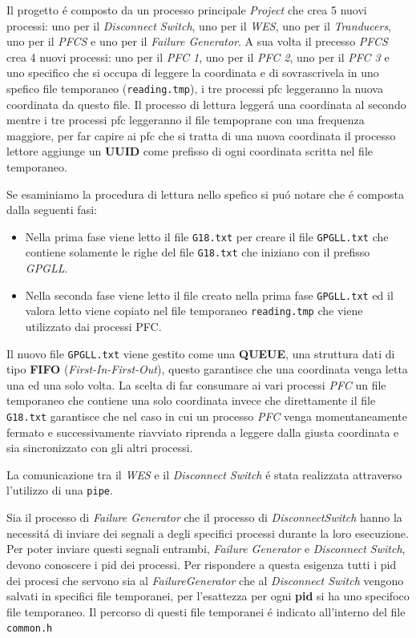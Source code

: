 \documentclass[11pt, oneside]{article}   	%
\begin{document}
Il progetto \'e composto da un processo principale \textit{Project} che crea 5 nuovi processi: uno per il \textit{Disconnect Switch}, uno per il \textit{WES}, uno per il \textit{Tranducers}, uno per il \textit{PFCS} e uno per il \textit{Failure Generator}. A sua volta il precesso \textit{PFCS} crea 4 nuovi processi: uno per il \textit{PFC 1}, uno per il \textit{PFC 2}, uno per il \textit{PFC 3} e uno specifico che si occupa di leggere la coordinata e di sovrascrivela in uno spefico file temporaneo (\texttt{reading.tmp}), i tre processi pfc leggeranno la nuova coordinata da questo file. Il processo di lettura legger\'a una coordinata al secondo mentre i tre processi pfc leggeranno il file tempoprane con una frequenza maggiore, per far capire ai pfc che si tratta di una nuova coordinata il processo lettore aggiunge un \textbf{UUID} come prefisso di ogni coordinata scritta nel file temporaneo.\par

Se esaminiamo la procedura di lettura nello spefico si pu\'o notare che \'e composta dalla seguenti fasi:
\begin{itemize}
	\item Nella prima fase viene letto il file \texttt{G18.txt} per creare il file \texttt{GPGLL.txt} che contiene solamente le righe del file \texttt{G18.txt} che iniziano con il prefisso \textit{GPGLL}.
	\item Nella seconda fase viene letto il file creato nella prima fase \texttt{GPGLL.txt} ed il valora letto viene copiato nel file temporaneo \texttt{reading.tmp} che viene utilizzato dai processi PFC.
\end{itemize}
Il nuovo file \texttt{GPGLL.txt} viene gestito come una \textbf{QUEUE}, una struttura dati di tipo \textbf{FIFO} (\textit{First-In-First-Out}), questo garantisce che una coordinata venga letta una ed una solo volta. La scelta di far consumare ai vari processi \textit{PFC} un file temporaneo che contiene una solo coordinata invece che direttamente il file \texttt{G18.txt} garantisce che nel caso in cui un processo \textit{PFC} venga momentaneamente fermato e successivamente riavviato riprenda a leggere dalla giusta coordinata e sia sincronizzato con gli altri processi.\par

La comunicazione tra il \textit{WES} e il \textit{Disconnect Switch} \'e stata realizzata attraverso l'utilizzo di una \texttt{pipe}.\par 

Sia il processo di \textit{Failure Generator} che il processo di \textit{DisconnectSwitch} hanno la necessit\'a di inviare dei segnali a degli specifici processi durante la loro esecuzione. Per poter inviare questi segnali entrambi, \textit{Failure Generator} e \textit{Disconnect Switch}, devono conoscere i pid dei processi. Per rispondere a questa esigenza tutti i pid dei procesi che servono sia al \textit{FailureGenerator} che al \textit{Disconnect Switch} vengono salvati in specifici file temporanei, per l'esattezza per ogni \textbf{pid} si ha uno specifoco file temporaneo. Il percorso di questi file temporanei \'e indicato all'interno del file \texttt{common.h} \par
\end{document}

